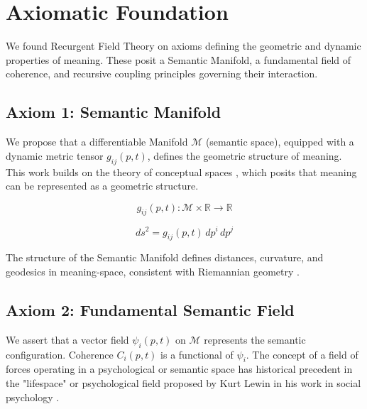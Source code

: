 \chapter{Axiomatic Foundation}
\label{1:axiomatic_foundation}

We found Recurgent Field Theory on axioms defining the geometric and dynamic properties of meaning. These posit a Semantic Manifold, a fundamental field of coherence, and recursive coupling principles governing their interaction.


\section{Axiom 1: Semantic Manifold}
\label{1.1:axiom_1_semantic_manifold}

We propose that a differentiable Manifold \(\mathcal{M}\) (semantic space), equipped with a dynamic metric tensor \(g_{ij}(p,t)\), defines the geometric structure of meaning. This work builds on the theory of conceptual spaces \autocite{Gardenfors2000}, which posits that meaning can be represented as a geometric structure.

\begin{equation}
g_{ij}(p,t) : \mathcal{M} \times \mathbb{R} \rightarrow \mathbb{R}
\end{equation}

\begin{equation}
ds^2 = g_{ij}(p,t) \, dp^i \, dp^j
\end{equation}

The structure of the Semantic Manifold defines distances, curvature, and geodesics in meaning-space, consistent with Riemannian geometry \autocite{Riemann1868}.


\section{Axiom 2: Fundamental Semantic Field}
\label{1.2:axiom_2_fundamental_semantic_field}

We assert that a vector field \(\psi_i(p,t)\) on \(\mathcal{M}\) represents the semantic configuration. Coherence \(C_i(p,t)\) is a functional of \(\psi_i\). The concept of a field of forces operating in a psychological or semantic space has historical precedent in the "lifespace" or psychological field proposed by Kurt Lewin in his work in social psychology \autocite{Lewin1951}.

